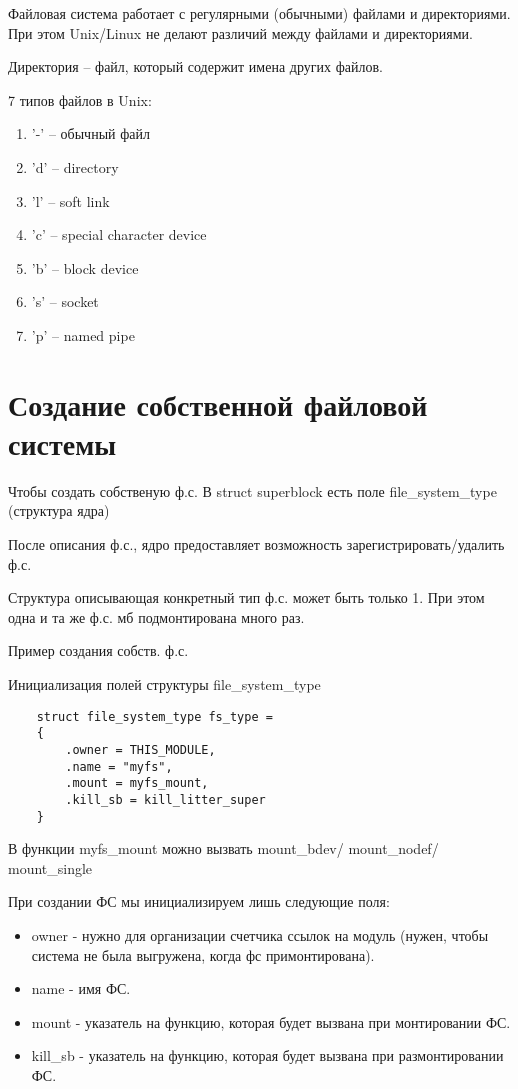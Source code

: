 Файловая система работает с регулярными (обычными) файлами и директориями. При этом Unix/Linux не делают различий между файлами и директориями.

Директория -- файл, который содержит имена других файлов.

7 типов файлов в Unix:
\begin{enumerate}
    \item '-' -- обычный файл
    \item 'd' -- directory
    \item 'l' -- soft link
    \item 'c' -- special character device
    \item 'b' -- block device
    \item 's' -- socket
    \item 'p' -- named pipe
\end{enumerate}

\section{Создание собственной файловой системы}

Чтобы создать собственую ф.с. В struct superblock есть поле file\_system\_type (структура ядра)

После описания ф.с., ядро предоставляет возможность зарегистрировать/удалить ф.с.

Структура описывающая конкретный тип ф.с. может быть только 1. При этом одна и та же ф.с. мб подмонтирована много раз.

Пример создания собств. ф.с.

Инициализация полей структуры file\_system\_type
\begin{lstlisting}
	struct file_system_type fs_type =
	{
		.owner = THIS_MODULE,
		.name = "myfs",
		.mount = myfs_mount,
		.kill_sb = kill_litter_super
	}
\end{lstlisting}

В функции myfs\_mount можно вызвать mount\_bdev/ mount\_nodef/ mount\_single

При создании ФС мы инициализируем лишь следующие поля:

\begin{itemize}[label=---]
	\item owner - нужно для организации счетчика ссылок на модуль (нужен, чтобы система не была выгружена, когда фс примонтирована).
	\item name - имя ФС.
	\item  mount - указатель на функцию, которая будет вызвана при монтировании ФС.
	\item kill\_sb - указатель на функцию, которая будет вызвана при размонтировании ФС.
\end{itemize}

